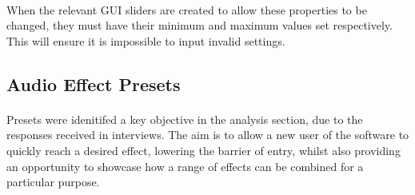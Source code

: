 \paragraph{}
When the relevant GUI sliders are created to allow these properties to be changed, they must have their minimum and maximum values set respectively. This will ensure it is impossible to input invalid settings.

\pagebreak
\subsection{Audio Effect Presets}
\paragraph{}
Presets were idenitifed a key objective in the analysis section, due to the responses received in interviews. The aim is to allow a new user of the software to quickly reach a desired effect, lowering the barrier of entry, whilst also providing an opportunity to showcase how a range of effects can be combined for a particular purpose.


